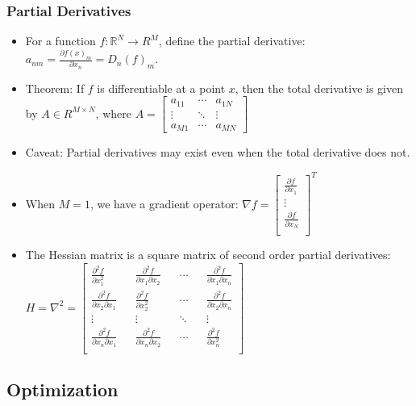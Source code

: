 \documentclass{article}
\begin{document}
\subsubsection{Partial Derivatives}
\begin{itemize}
    \item For a function $ f : \mathbb{R}^N \rightarrow R^M$, define the partial
    derivative: $ a_{nm} = \frac{\partial f{(x)}_m}{\partial x_n} = D_n{(f)}_m $.
    \item Theorem: If $ f $ is differentiable at a point $ x $, then the total 
    derivative is given by $ A \in R^{M \times N} $, where $ A = \begin{bmatrix}
        a_{11} & \cdots & a_{1N} \\
        \vdots & \ddots & \vdots \\
        a_{M1} & \cdots & a_{MN} 
        \end{bmatrix} $
    \item Caveat: Partial derivatives may exist even when the total derivative 
    does not.
    \item When $ M=1  $, we have a gradient operator: $ \nabla f = \begin{bmatrix}
        \frac{\partial f}{\partial x_1} \\
        \vdots \\
        \frac{\partial f}{\partial x_N} \\
        \end{bmatrix}^T $
    \item The Hessian matrix is a square matrix of second order partial derivatives:
    $ H = \nabla^2 = \begin{bmatrix}
        \frac{\partial^2 f}{\partial x_1^2} && \frac{\partial^2 f}{\partial x_1 \partial x_2} && \cdots && \frac{\partial^2 f}{\partial x_1 \partial x_n} \\
        \frac{\partial^2 f}{\partial x_2 \partial x_1} && \frac{\partial^2 f}{\partial x_2^2} && \cdots && \frac{\partial^2 f}{\partial x_2 \partial x_n} \\
        \vdots && \vdots && \ddots && \vdots \\
        \frac{\partial^2 f}{\partial x_n \partial x_1} && \frac{\partial^2 f}{\partial x_n \partial x_2} && \cdots && \frac{\partial^2 f}{\partial x_n^2} \\
        \end{bmatrix} $
\end{itemize}

\subsection{Optimization}
\end{document}
